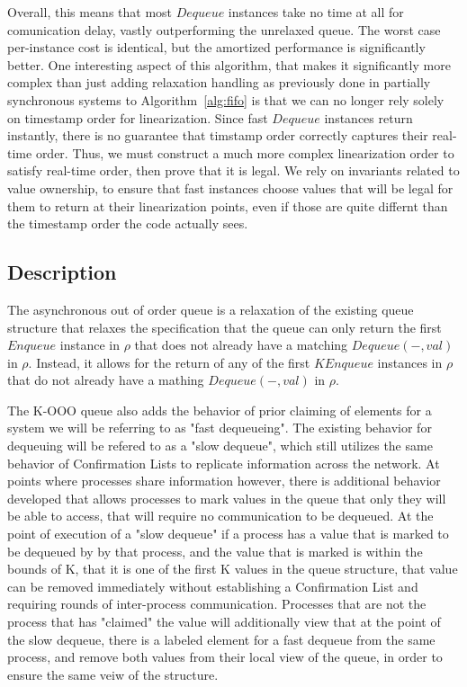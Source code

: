 \documentclass[a4paper,anonymous,USenglish]{lipics-v2021} %
\theoremstyle{definition}
\begin{document}
Overall, this means that most $Dequeue$ instances take no time at all for comunication delay, vastly outperforming the unrelaxed queue.  The worst case per-instance cost is identical, but the amortized performance is significantly better.  One interesting aspect of this algorithm, that makes it significantly more complex than just adding relaxation handling as previously done in partially synchronous systems to Algorithm~\ref{alg:fifo} is that we can no longer rely solely on timestamp order for linearization.  Since fast $Dequeue$ instances return instantly, there is no guarantee that timstamp order correctly captures their real-time order.  Thus, we must construct a much more complex linearization order to satisfy real-time order, then prove that it is legal.  We rely on invariants related to value ownership, to ensure that fast instances choose values that will be legal for them to return at their linearization points, even if those are quite differnt than the timestamp order the code actually sees. 

\subsection{Description}

The asynchronous out of order queue is a relaxation of the existing queue structure that relaxes the specification that the queue can only return the first $Enqueue$ instance in $\rho$ that does not already have a matching $Dequeue(-, val)$ in $\rho$. Instead, it allows for the return of any of the first $K Enqueue$ instances in $\rho$ that do not already have a mathing $Dequeue(-, val)$ in $\rho$. 

The K-OOO queue also adds the behavior of prior claiming of elements for a system we will be referring to as "fast dequeueing". The existing behavior for dequeuing will be refered to as a "slow dequeue", which still utilizes the same behavior of Confirmation Lists to replicate information across the network. At points where processes share information however, there is additional behavior developed that allows processes to mark values in the queue that only they will be able to access, that will require no communication to be dequeued. At the point of execution of a "slow dequeue" if a process has a value that is marked to be dequeued by by that process, and the value that is marked is within the bounds of K, that it is one of the first K values in the queue structure, that value can be removed immediately without establishing a Confirmation List and requiring rounds of inter-process communication. Processes that are not the process that has "claimed" the value will additionally view that at the point of the slow dequeue, there is a labeled element for a fast dequeue from the same process, and remove both values from their local view of the queue, in order to ensure the same veiw of the structure. 
\end{document}

